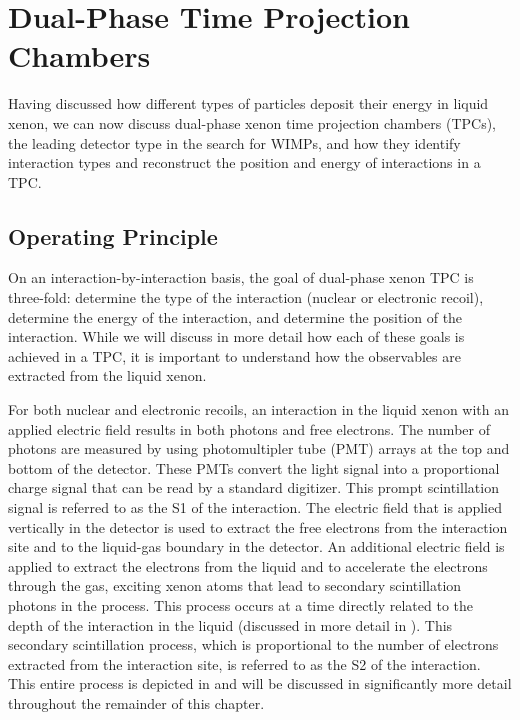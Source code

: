 \section{Dual-Phase Time Projection Chambers}
\label{sec:lxe_tpc}

Having discussed how different types of particles deposit their energy in liquid xenon, we can now discuss dual-phase xenon time projection chambers (TPCs), the leading detector type in the search for WIMPs, and how they identify interaction types and reconstruct the position and energy of interactions in a TPC.



\subsection{Operating Principle}
\label{sec:tpc_operating_principle}

On an interaction-by-interaction basis, the goal of dual-phase xenon TPC is three-fold: determine the type of the interaction (nuclear or electronic recoil), determine the energy of the interaction, and determine the position of the interaction.  While we will discuss in more detail how each of these goals is achieved in a TPC, it is important to understand how the observables are extracted from the liquid xenon.  

For both nuclear and electronic recoils, an interaction in the liquid xenon with an applied electric field results in both photons and free electrons.  The number of photons are measured by using photomultipler tube (PMT) arrays at the top and bottom of the detector.  These PMTs convert the light signal into a proportional charge signal that can be read by a standard digitizer.  This prompt scintillation signal is referred to as the S1 of the interaction.  The electric field that is applied vertically in the detector is used to extract the free electrons from the interaction site and to the liquid-gas boundary in the detector.  An additional electric field is applied to extract the electrons from the liquid and to accelerate the electrons through the gas, exciting xenon atoms that lead to secondary scintillation photons in the process.  This process occurs at a time directly related to the depth of the interaction in the liquid (discussed in more detail in ).  This secondary scintillation process, which is proportional to the number of electrons extracted from the interaction site, is referred to as the S2 of the interaction.  This entire process is depicted in  and will be discussed in significantly more detail throughout the remainder of this chapter.

